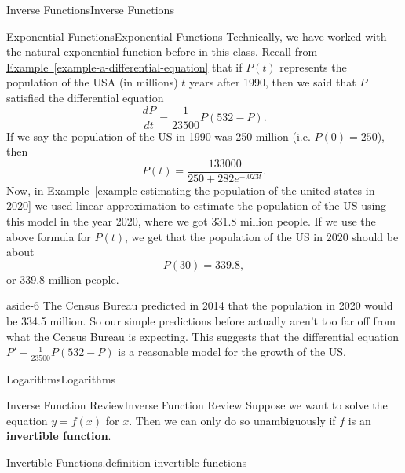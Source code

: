\documentclass[10pt,]{book}
\newcommand{\terminology}[1]{\textbf{#1}}
\numberwithin{equation}{section}
\newcommand{\dv}[3][]{\dfrac{d^{#1} #2}{d #3^{#1}}}
\begin{document}
\begin{chapterptx}{Inverse Functions}{}{Inverse Functions}{}{}
\begin{sectionptx}{Exponential Functions}{}{Exponential Functions}{}{}
Technically, we have worked with the natural exponential function before in this class. Recall from \hyperref[example-a-differential-equation]{Example~\ref{example-a-differential-equation}} that if \(P(t)\) represents the population of the USA (in millions) \(t\) years after 1990, then we said that \(P\) satisfied the differential equation%
\begin{equation*}
\dv{P}{t} = \frac{1}{23500}P(532 - P).
\end{equation*}
If we say the population of the US in 1990 was 250 million (i.e. \(P(0) = 250\)), then%
\begin{equation*}
P(t) = \frac{133000}{250 + 282e^{-.023t}}.
\end{equation*}
Now, in \hyperref[example-estimating-the-population-of-the-united-states-in-2020]{Example~\ref{example-estimating-the-population-of-the-united-states-in-2020}} we used linear approximation to estimate the population of the US using this model in the year 2020, where we got 331.8 million people. If we use the above formula for \(P(t)\), we get that the population of the US in 2020 should be about%
\begin{equation*}
P(30) = 339.8,
\end{equation*}
or 339.8 million people.%
\begin{aside}{}{aside-6}%
\hypertarget{p-197}{}%
The Census Bureau predicted in 2014 that the population in 2020 would be 334.5 million. So our simple predictions before actually aren't too far off from what the Census Bureau is expecting. This suggests that the differential equation \(P' - \frac{1}{23500}P(532-P)\) is a reasonable model for the growth of the US.%
\end{aside}
\end{sectionptx}
%
%
\typeout{************************************************}
\typeout{************************************************}
%
\begin{sectionptx}{Logarithms}{}{Logarithms}{}{}\label{section-logarithms}
%
%
\typeout{************************************************}
\typeout{************************************************}
%
\begin{subsectionptx}{Inverse Function Review}{}{Inverse Function Review}{}{}\label{subsection-inverse-function-review}
\hypertarget{p-198}{}%
Suppose we want to solve the equation \(y = f(x)\) for \(x\). Then we can only do so unambiguously if \(f\) is an \terminology{invertible function}.%
\begin{definition}{Invertible Functions.}{definition-invertible-functions}%

\end{definition}
\end{subsectionptx}
\end{sectionptx}
\end{chapterptx}
\end{document}
